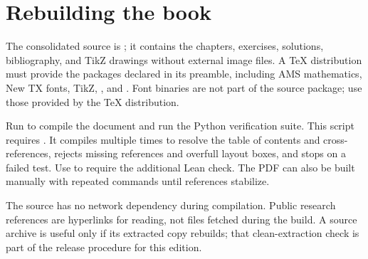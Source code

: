 \section{Rebuilding the book}
The consolidated source is ; it contains the chapters, exercises, solutions, bibliography, and TikZ drawings without external image files. A TeX distribution must provide the packages declared in its preamble, including AMS mathematics, New TX fonts, TikZ, , and . Font binaries are not part of the source package; use those provided by the TeX distribution.

Run  to compile the document and run the Python verification suite. This script requires . It compiles multiple times to resolve the table of contents and cross-references, rejects missing references and overfull layout boxes, and stops on a failed test. Use  to require the additional Lean check. The PDF can also be built manually with repeated  commands until references stabilize.

The source has no network dependency during compilation. Public research references are hyperlinks for reading, not files fetched during the build. A source archive is useful only if its extracted copy rebuilds; that clean-extraction check is part of the release procedure for this edition.
